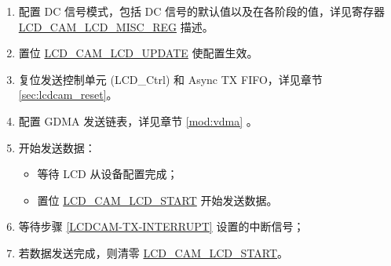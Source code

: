 \documentclass[main\_\_CN.tex]{subfiles}
\begin{document}
\begin{enumerate}
\begin{itemize}
\begin{tiplisting}
\vspace{-2em}
\begin{enumerate}
    \item \label{camlcdctrl-note-1} 定长输出模式是指：LCD 发送完成 \hyperref[fielddesc:LCDCAMLCDDOUTCYCLELEN]{LCD\_CAM\_LCD\_DOUT\_CYCLELEN} 中配置的数据长度即结束 LCD 发送。
    \item \label{camlcdctrl-note-2} 持续输出模式是指：LCD 持续发送数据，直到
    \begin{enumerate}
        \item \hyperref[fielddesc:LCDCAMLCDSTART]{LCD\_CAM\_LCD\_START} 被清零；
        \item 或 \hyperref[fielddesc:LCDCAMLCDRESET]{LCD\_CAM\_LCD\_RESET} 被置位；
        \item 或 GDMA 中所有数据被发送完。
    \end{enumerate}
\end{enumerate}
\end{tiplisting}

\end{itemize}
    \item 配置 DC 信号模式，包括 DC 信号的默认值以及在各阶段的值，详见寄存器 \hyperref[regdesc:LCDCAMLCDMISCREG]{LCD\_CAM\_LCD\_MISC\_REG} 描述。

    \item 置位 \hyperref[fielddesc:LCDCAMLCDUPDATE]{LCD\_CAM\_LCD\_UPDATE} 使配置生效。

    \item 复位发送控制单元 (LCD\_Ctrl) 和 Async TX FIFO，详见章节 \ref{sec:lcdcam_reset}。

    \item 配置 GDMA 发送链表，详见章节 \ref{mod:vdma} \textit{}。

    \item 开始发送数据：
    \begin{itemize}
        \item 等待 LCD 从设备配置完成；
        \item 置位 \hyperref[fielddesc:LCDCAMLCDSTART]{LCD\_CAM\_LCD\_START} 开始发送数据。
    \end{itemize}

    \item 等待步骤 \ref{LCDCAM-TX-INTERRUPT} 设置的中断信号；

    \item 若数据发送完成，则清零 \hyperref[fielddesc:LCDCAMLCDSTART]{LCD\_CAM\_LCD\_START}。
\end{enumerate}
\end{document}

